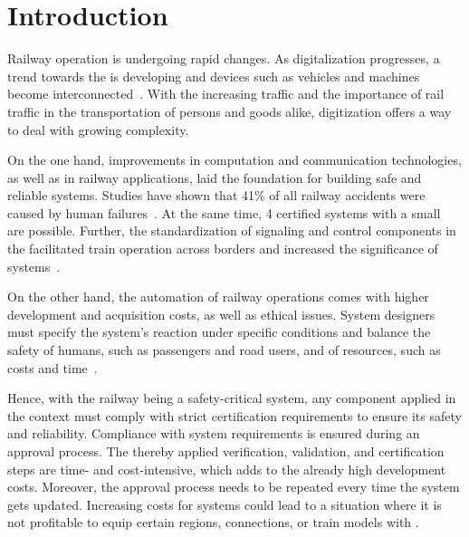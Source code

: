 \chapter{Introduction}


Railway operation is undergoing rapid changes.
%
As digitalization progresses, a trend towards the  is developing and devices such as vehicles and machines become interconnected~\cite{RailwayDigitalization}.
With the increasing traffic and the importance of rail traffic in the transportation of persons and goods alike, digitization offers a way to deal with growing complexity.

On the one hand, improvements in computation and communication technologies, as well as in railway applications, laid the foundation for building safe and reliable systems.
Studies have shown that 41\% of all railway accidents were caused by human failures~\cite{StudyRailwayAccidents}.
At the same time,  4 certified  systems with a small ~\cite{SallekSIL} are possible.
Further, the standardization of signaling and control components in the  facilitated train operation across borders and increased the significance of  systems~\cite{YIN2017RNDofATO}.

On the other hand, the automation of railway operations comes with higher development and acquisition costs, as well as ethical issues.
System designers must specify the system's reaction under specific conditions and balance the safety of humans, such as passengers and road users, and of resources, such as costs and time~\cite{EthicsInSafety}.

Hence, with the railway being a safety-critical system, any component applied in the  context must comply with strict certification requirements to ensure its safety and reliability.
Compliance with system requirements is ensured during an approval process.
The thereby applied verification, validation, and certification steps are time- and cost-intensive, which adds to the already high development costs.
Moreover, the approval process needs to be repeated every time the system gets updated.
Increasing costs for  systems could lead to a situation where it is not profitable to equip certain regions, connections, or train models with .
\\

